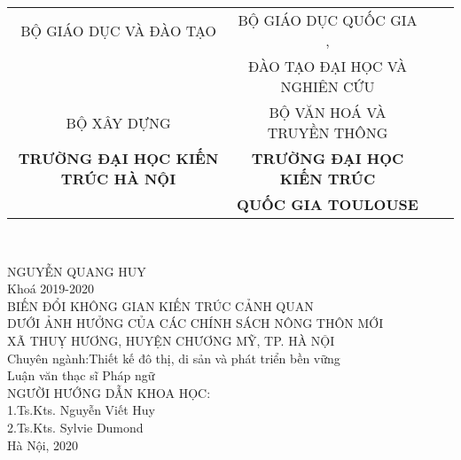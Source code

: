 \documentclass[../thesis.tex]{subfiles}
\begin{document}
\begin{titlepage}

\begin{center}
\begin{table}
\small
\centering
\begin{tabular}{c c r l}
BỘ GIÁO DỤC VÀ ĐÀO TẠO  &  BỘ GIÁO DỤC QUỐC GIA ,\\
 & ĐÀO TẠO ĐẠI HỌC VÀ NGHIÊN CỨU\\ 
BỘ XÂY DỰNG & BỘ VĂN HOÁ VÀ TRUYỀN THÔNG\\
\textbf{TRƯỜNG ĐẠI HỌC KIẾN TRÚC HÀ NỘI} & \textbf{TRƯỜNG ĐẠI HỌC KIẾN TRÚC}\\
& \textbf{QUỐC GIA TOULOUSE}
\end{tabular}
\\[1cm]
\end{table}

\normalsize NGUYỄN QUANG HUY\\[1cm]
Khoá 2019-2020\\[1cm]


\large BIẾN ĐỔI KHÔNG GIAN KIẾN TRÚC CẢNH QUAN \\ DƯỚI ẢNH HƯỞNG CỦA CÁC CHÍNH SÁCH NÔNG THÔN MỚI \\ XÃ THUỴ HƯƠNG, HUYỆN CHƯƠNG MỸ, TP. HÀ NỘI\\[2cm]

\normalsize Chuyên ngành:Thiết kế đô thị, di sản và phát triển bền vững\\
Luận văn thạc sĩ Pháp ngữ\\[1cm]

NGƯỜI HƯỚNG DẪN KHOA HỌC:\\[1cm]
1.Ts.Kts. Nguyễn Viết Huy\\
2.Ts.Kts. Sylvie Dumond\\[1cm]


Hà Nội, 2020

\end{center}

\end{titlepage}
\end{document}
